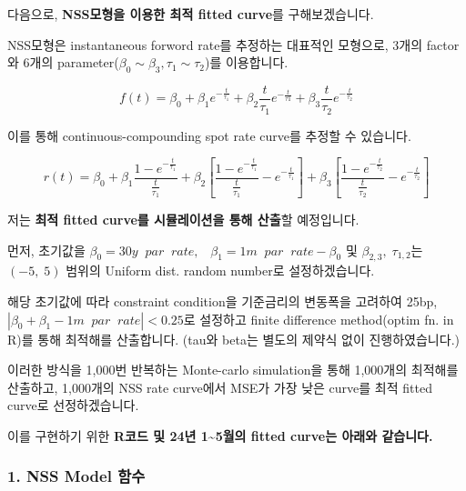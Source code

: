 \documentclass[
  a4paper,
  DIV=11,
  numbers=noendperiod]{scrreprt}
\begin{document}
다음으로, \textbf{NSS모형을 이용한 최적 fitted curve}를 구해보겠습니다.

\begin{tcolorbox}[enhanced jigsaw, toprule=.15mm, colframe=quarto-callout-note-color-frame, opacitybacktitle=0.6, bottomtitle=1mm, left=2mm, breakable, coltitle=black, title=\textcolor{quarto-callout-note-color}{\faInfo}\hspace{0.5em}{Nelson-Siegel-Svensson Model}, colbacktitle=quarto-callout-note-color!10!white, opacityback=0, bottomrule=.15mm, toptitle=1mm, leftrule=.75mm, titlerule=0mm, colback=white, arc=.35mm, rightrule=.15mm]

NSS모형은 instantaneous forword rate를 추정하는 대표적인 모형으로, 3개의
factor와 6개의 parameter(\(\beta_0\sim\beta_3, \tau_1\sim\tau_2\))를
이용합니다.

\[f(t)=\beta_0+\beta_1e^{-\frac{t}{\tau_1}}+\beta_2\frac{t}{\tau_1}e^{-\frac{t}{\tau1}}+\beta_3\frac{t}{\tau_2}e^{-\frac{t}{\tau_2}}\]

이를 통해 continuous-compounding spot rate curve를 추정할 수 있습니다.

\[r(t)=\beta_0+\beta_1\frac{1-e^{-\frac{t}{\tau_1}}}{\frac{t}{\tau_1}}+\beta_2[\frac{1-e^{-\frac{t}{\tau_1}}}{\frac{t}{\tau_1}}-e^{-\frac{t}{\tau_1}}]+\beta_3[\frac{1-e^{-\frac{t}{\tau_2}}}{\frac{t}{\tau_2}}-e^{-\frac{t}{\tau_2}}]\]

\end{tcolorbox}

저는 \textbf{최적 fitted curve를 시뮬레이션을 통해 산출}할 예정입니다.

먼저, 초기값을
\(\beta_0=30y\;\;par\;\;rate,\;\;\;\beta_1=1m\;\;par\;\;rate-\beta_0\)
및 \(\beta_{2,3},\;\tau_{1,2}\)는 \((-5,\;5)\) 범위의 Uniform dist.
random number로 설정하겠습니다.

해당 초기값에 따라 constraint condition을 기준금리의 변동폭을 고려하여
25bp, \(|\beta_0+\beta_1-1m\;\;par\;\;rate|<0.25\)로 설정하고 finite
difference method(optim fn. in R)를 통해 최적해를 산출합니다. (tau와
beta는 별도의 제약식 없이 진행하였습니다.)

이러한 방식을 1,000번 반복하는 Monte-carlo simulation을 통해 1,000개의
최적해를 산출하고, 1,000개의 NSS rate curve에서 MSE가 가장 낮은 curve를
최적 fitted curve로 선정하겠습니다.

이를 구현하기 위한 \textbf{R코드 및 24년 1\textasciitilde5월의 fitted
curve는 아래와 같습니다.}

\subsubsection*{1. NSS Model 함수}\label{nss-model-uxd568uxc218}
\end{document}
